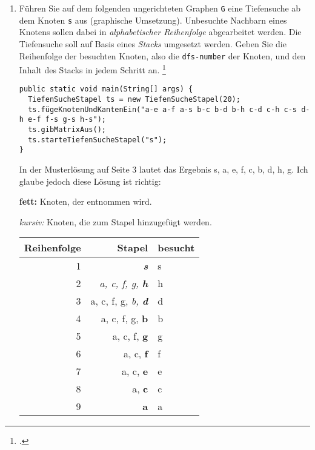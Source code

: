 \documentclass{lehramt-informatik-aufgabe}
\begin{document}
\begin{enumerate}


\item Führen Sie auf dem folgenden ungerichteten Graphen \texttt{G} eine
Tiefensuche ab dem Knoten \texttt{s} aus (graphische Umsetzung).
Unbesuchte Nachbarn eines Knotens sollen dabei in \emph{alphabetischer
Reihenfolge} abgearbeitet werden. Die Tiefensuche soll auf Basis eines
\emph{Stacks} umgesetzt werden. Geben Sie die
Reihenfolge der besuchten Knoten, also die \texttt{dfs-number} der
Knoten, und den Inhalt des Stacks in jedem Schritt an.
\footcite[Seite 2, Aufgabe 3: Tiefensuche, Breitensuche]{aud:ab:6}

\begin{verbatim}
public static void main(String[] args) {
  TiefenSucheStapel ts = new TiefenSucheStapel(20);
  ts.fügeKnotenUndKantenEin("a-e a-f a-s b-c b-d b-h c-d c-h c-s d-h e-f f-s g-s h-s");
  ts.gibMatrixAus();
  ts.starteTiefenSucheStapel("s");
}
\end{verbatim}

\begin{liAntwort}
In der Musterlösung auf Seite 3 lautet das Ergebnis s, a, e, f, c, b, d, h, g.
Ich glaube jedoch diese Lösung ist richtig:

\textbf{fett:} Knoten, der entnommen wird.

\textit{kursiv:} Knoten, die zum Stapel hinzugefügt werden.

\begin{tabular}{|r|r|l|}
\hline
\textbf{Reihenfolge} & \textbf{Stapel} & \textbf{besucht} \\\hline\hline
1 & \textit{\textbf{s}} & s \\\hline
2 & \textit{a, c, f, g, \textbf{h}} & h \\\hline
3 & a, c, f, g, \textit{b, \textbf{d}} & d \\\hline
4 & a, c, f, g, \textbf{b} & b \\\hline
5 & a, c, f, \textbf{g} & g \\\hline
6 & a, c, \textbf{f} & f \\\hline
7 & a, c, \textbf{e} & e \\\hline
8 & a, \textbf{c} & c \\\hline
9 & \textbf{a} & a \\\hline
\end{tabular}
\end{liAntwort}


\end{enumerate}
\end{document}
